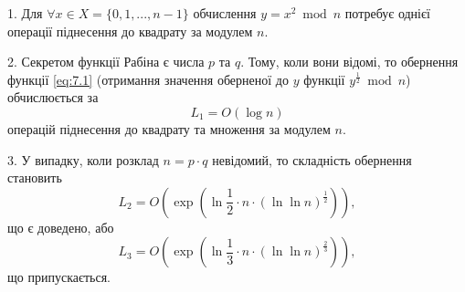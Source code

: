 \par1. Для $\forall x \in X = \{ 0, 1, ..., n-1 \}$ обчислення $y = x ^{2} \bmod n$ потребує однієї операції піднесення до квадрату за модулем $n$.
\par2. Секретом функції Рабіна є числа $p$ та $q$. Тому, коли вони відомі, то обернення функції \eqref{eq:7.1} (отримання значення оберненої до $y$ функції $y ^{\frac{1}{2}} \bmod n$) обчислюється за
\begin{equation} \label{eq:7.2} 
L_1 = O(\log{n})
\end{equation}
операцій піднесення до квадрату та множення за модулем $n$.
\par3. У випадку, коли розклад $n = p \cdot q$ невідомий, то складність обернення становить
\begin{equation} \label{eq:7.3}
L_2 = O(\exp{(\ln{\frac{1}{2}} \cdot n \cdot (\ln{\ln{n}})^{\frac{1}{2}})}),
\end{equation}
що є доведено, або
\begin{equation} \label{eq:7.4}
L_3 = O(\exp{(\ln{\frac{1}{3}} \cdot n \cdot (\ln{\ln{n}})^{\frac{2}{3}})}),
\end{equation}
що припускається.

